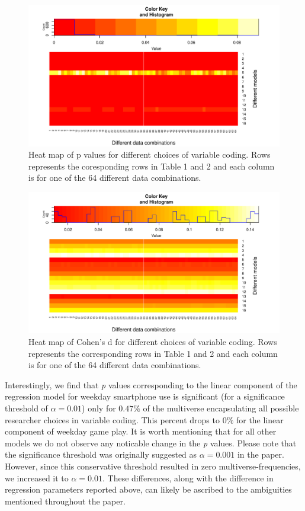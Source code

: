 \documentclass[man]{apa6}
\theoremstyle{definition}
\theoremstyle{definition}
\theoremstyle{definition}
\theoremstyle{remark}
\begin{document}
\begin{figure}
\centering
\includegraphics{stats_6_final_files/figure-latex/heat-p-data-1.pdf}
\caption{\label{fig:heat-p-data}Heat map of p values for different choices
of variable coding. Rows represents the coresponding rows in Table 1 and
2 and each column is for one of the 64 different data combinations.}
\end{figure}

\begin{figure}
\centering
\includegraphics{stats_6_final_files/figure-latex/heat-d-data-1.pdf}
\caption{\label{fig:heat-d-data}Heat map of Cohen's d for different choices
of variable coding. Rows represents the corresponding rows in Table 1
and 2 and each column is for one of the 64 different data combinations.}
\end{figure}

Interestingly, we find that \emph{p} values corresponding to the linear
component of the regression model for weekday smartphone use is
significant (for a significance threshold of \(\alpha = 0.01\)) only for
\(0.47\%\) of the multiverse encapsulating all possible researcher
choices in variable coding. This percent drops to \(0\%\) for the linear
component of weekday game play. It is worth mentioning that for all
other models we do not observe any noticable change in the \emph{p}
values. Please note that the significance threshold was originally
suggested as \(\alpha = 0.001\) in the paper. However, since this
conservative threshold resulted in zero multiverse-frequencies, we
increased it to \(\alpha = 0.01\). These differences, along with the
difference in regression parameters reported above, can likely be
ascribed to the ambiguities mentioned throughout the paper.
\end{document}
